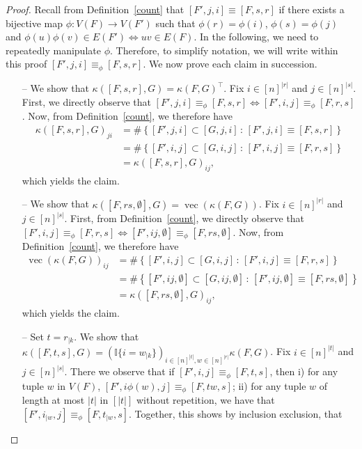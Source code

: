 \documentclass{article}
\theoremstyle{plain}
\DeclareMathOperator{\vect}{vec}
\begin{document}
\begin{proof}%
Recall from Definition~\ref{count} that $[F',j,i]\equiv [F,s,r]$ if there exists a bijective map $\phi:V(F)\to V(F')$ such that $\phi(r)=\phi(i)$, $\phi(s)=\phi(j)$ and $\phi(u)\phi(v)\in E(F') \Leftrightarrow uv\in E(F)$. In the following, we need to repeatedly manipulate $\phi$. Therefore, to simplify notation, we will write within this proof $[F',j,i]\equiv_\phi [F,s,r]$. We now prove each claim in succession. 
\vspace{-.3333\baselineskip}
\begin{itemize}[leftmargin= *]
\item[--] We show that $\kappa([F,s,r],G)=\kappa(F,G)^\top$. Fix $i\in[n]^{|r|}$ and $j\in[n]^{|s|}$. First, we directly observe that $[F',j,i]\equiv_\phi [F,s,r] \Leftrightarrow [F',i,j]\equiv_\phi [F,r,s]$. Now, from Definition~\ref{count}, we therefore have
\begin{align*}
\kappa([F,s,r],G)_{ji} &= \#\left\{[F',j,i]\subset [G,j,i]\,:\,[F',j,i]\equiv [F,s,r]\right\}\\
&= \#\left\{[F',i,j]\subset [G,i,j]\,:\,[F',i,j]\equiv [F,r,s]\right\}\\
& = \kappa([F,s,r],G)_{ij},
\end{align*}
which yields the claim.
\item[--] We show that  $\kappa([F,rs,\emptyset],G)=\vect(\kappa(F,G))$. Fix $i\in[n]^{|r|}$ and $j\in[n]^{|s|}$. First, from Definition~\ref{count}, we directly observe that $[F',i,j]\equiv_\phi [F,r,s] \Leftrightarrow [F',ij,\emptyset]\equiv_\phi [F,rs,\emptyset]$. Now, from Definition~\ref{count}, we therefore have
\begin{align*}
\vect(\kappa(F,G))_{ij}
&= \#\left\{[F',i,j]\subset [G,i,j]\,:\,[F',i,j]\equiv [F,r,s]\right\}\\
&= \#\left\{[F',ij,\emptyset]\subset [G,ij,\emptyset]\,:\,[F',ij,\emptyset]\equiv [F,rs,\emptyset]\right\}\\
&= \kappa([F,rs,\emptyset],G)_{ij},
\end{align*}
which yields the claim.
\item[--] Set $t= r_{|k}$. We show that $\kappa([F,t,s],G)\!=\!(\mathbb{I}\{i=w_{|k}\})_{i\in[n]^{|t|},w\in[n]^{|r|}}\kappa(F,G)$. Fix $i\in[n]^{|t|}$ and $j\in[n]^{|s|}$. There we observe that if $[F',i,j]\equiv_\phi [F,t,s]$, then i) for any tuple $w$ in $V(F)$, $[F',i\phi(w),j]\equiv_\phi [F,tw,s]$; ii) for any tuple $w$ of length at most $|t|$ in $[|t|]$ without repetition, we have that $[F',i_{|w},j]\equiv_\phi [F,t_{|w},s]$. Together, this shows by inclusion exclusion, that

\end{itemize}
\end{proof}
\end{document}
